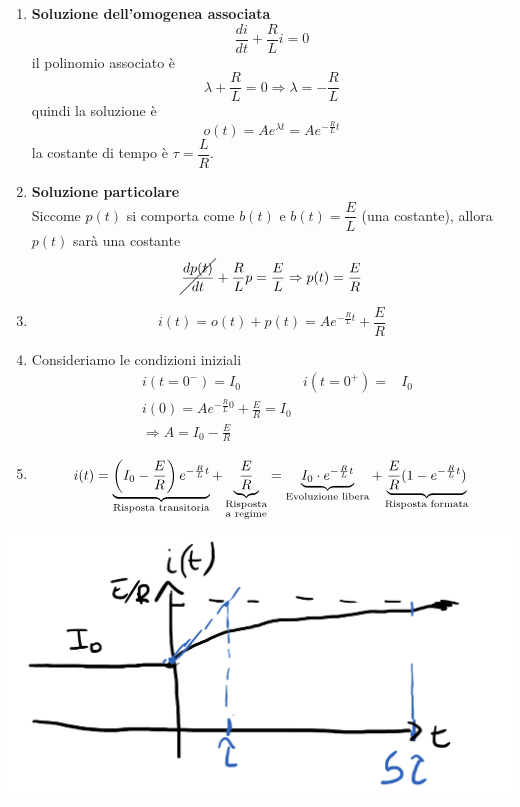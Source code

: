 \documentclass{article}
\begin{document}
\begin{enumerate}
    \item \textbf{Soluzione dell'omogenea associata}
    \[
        \frac{di}{dt} + \frac{R}{L}i = 0
    \]
    il polinomio associato è 
    \[
        \lambda + \frac{R}{L} = 0 \Rightarrow \lambda = -\frac{R}{L}
    \]
    quindi la soluzione è
    \[
        o(t) = A e^{\lambda t} = A e^{-\frac{R}{L}t}
    \]
    la costante di tempo è $\tau = \dfrac{L}{R}$.
    \item \textbf{Soluzione particolare}\\
    Siccome $p(t)$ si comporta come $b(t)$ e $b(t)=\dfrac{E}{L}$ (una costante), allora $p(t)$ sarà una costante
    \[
        \cancel{\frac{dp(t)}{dt}} + \frac{R}{L}p = \frac{E}{L} \Rightarrow p(t) = \frac{E}{R} 
    \]

    \item \[ i(t) = o(t)+p(t) = A e^{-\frac{R}{L}t} + \frac{E}{R}  \] 
    
    \item Consideriamo le condizioni iniziali
    \begin{align*}
        &i(t=0^-) = I_0 & i(t=0^+) = &I_0\\
        &i(0) = A e^{-\frac{R}{L}0} + \frac{E}{R} = I_0\\
        &\Rightarrow A = I_0 - \frac{E}{R}
    \end{align*}

    \item \[ i(t) = \underbrace{\left(I_0-\frac{E}{R}\right)e^{-\frac{R}{L}t}}_{\text{Risposta transitoria}} + \underbrace{\frac{E}{R}}_{\substack{\text{Risposta}\\\text{a regime}}} = \underbrace{I_0 \cdot  e^{-\frac{R}{L}t}}_{\text{Evoluzione libera}} + \underbrace{\frac{E}{R}(1-e^{-\frac{R}{L}t})}_{\text{Risposta formata}} \]
\end{enumerate}
\begin{center}
    \includegraphics[scale=0.25]{Image/RL_3.png}
\end{center}
\end{document}
